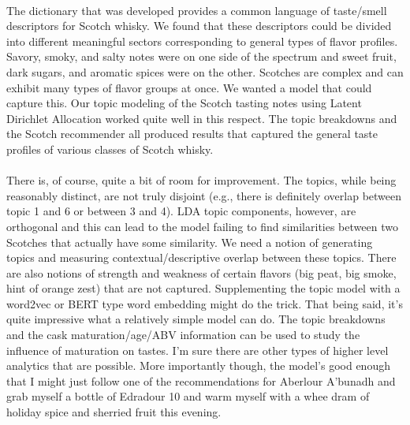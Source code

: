 \documentclass{article}
\begin{document}
\paragraph{} The dictionary that was developed provides a common language of taste/smell descriptors for Scotch whisky. We found that these descriptors could be divided into different meaningful sectors corresponding to general types of flavor profiles. Savory, smoky, and salty notes were on one side of the spectrum and sweet fruit, dark sugars, and aromatic spices were on the other. Scotches are complex and can exhibit many types of flavor groups at once. We wanted a model that could capture this. Our topic modeling of the Scotch tasting notes using Latent Dirichlet Allocation worked quite well in this respect. The topic breakdowns and the Scotch recommender all produced results that captured the general taste profiles of various classes of Scotch whisky.
\paragraph{} There is, of course, quite a bit of room for improvement. The topics, while being reasonably distinct, are not truly disjoint (e.g., there is definitely overlap between topic 1 and 6 or between 3 and 4). LDA topic components, however, are orthogonal and this can lead to the model failing to find similarities between two Scotches that actually have some similarity. We need a notion of generating topics and measuring contextual/descriptive overlap between these topics. There are also notions of strength and weakness of certain flavors (big peat, big smoke, hint of orange zest) that are not captured. Supplementing the topic model with a word2vec or BERT type word embedding might do the trick. That being said, it's quite impressive what a relatively simple model can do. The topic breakdowns and the cask maturation/age/ABV information can be used to study the influence of maturation on tastes. I'm sure there are other types of higher level analytics that are possible.  More importantly though, the model's good enough that I might just follow one of the recommendations for Aberlour A'bunadh and grab myself a bottle of Edradour 10 and warm myself with a whee dram of holiday spice and sherried fruit this evening.
\end{document}
